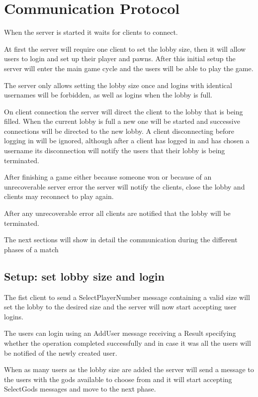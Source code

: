 \documentclass{article}
\begin{document}
\section*{Communication Protocol}
When the server is started it waits for clients to connect.

At first the server will require one client to set the lobby size, then it will allow users to login and set up their player and pawns. After this initial setup the server will enter the main game cycle and the users will be able to play the game.

The server only allows setting the lobby size once and logins with identical usernames will be forbidden, as well as logins when the lobby is full.

On client connection the server will direct the client to the lobby that is being filled. When the current lobby is full a new one will be started and successive connections will be directed to the new lobby.
A client disconnecting before logging in will be ignored, although after a client has logged in and has chosen a username its disconnection will notify the users that their lobby is being terminated.

After finishing a game either because someone won or because of an unrecoverable server error the server will notify the clients, close the lobby and clients may reconnect to play again.

After any unrecoverable error all clients are notified that the lobby will be terminated.

\vspace{8pt}

\noindent
The next sections will show in detail the communication during the different phases of a match

\subsection*{Setup: set lobby size and login}
The fist client to send a SelectPlayerNumber message containing a valid size will set the lobby to the desired size and the server will now start accepting user logins.

The users can login using an AddUser message receiving a Result specifying whether the operation completed successfully and in case it was all the users will be notified of the newly created user.

When as many users as the lobby size are added the server will send a message to the users with the gods available to choose from and it will start accepting SelectGods messages and move to the next phase.
\end{document}
